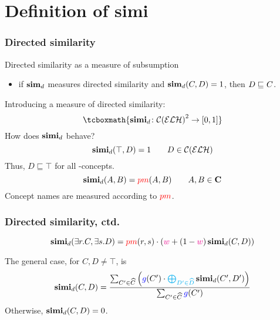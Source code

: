 \documentclass[smaller]{beamer}
\begin{document}
\section{Definition of simi}

\begin{frame}
  \frametitle{Directed similarity}
  \alert{Directed similarity} as a measure of subsumption
  \begin{itemize}
    \item if \(\operatorname{\mathbf{sim}}_d\) measures directed similarity and \(\operatorname{\mathbf{sim}}_d(C,D) = 1\), then \(D \sqsubseteq_{\mathcal{}} C\).
  \end{itemize}
  Introducing a measure of directed similarity:
  \begin{equation}
  \tcboxmath{\simi_d \colon {\mathcal{C}(\mathcal{ELH})}^2 \to [0,1]}
  \end{equation}
  How does \(\operatorname{\mathbf{simi}}_d\) behave?
  \begin{equation}
    \operatorname{\mathbf{simi}}_d(\top,D) = 1 \qquad D \in \mathcal{C}(\mathcal{ELH})
  \end{equation}
  Thus, \(D \sqsubseteq \top\) for all \elh-concepts.
  \begin{equation}
    \operatorname{\mathbf{simi}}_d(A,B) = \textcolor{red}{pm}(A,B) \qquad A,B \in \mathbf{C}
  \end{equation}
  Concept names are measured according to \(\textcolor{red}{pm}\).
\end{frame}

\begin{frame}
  \frametitle{Directed similarity, ctd.}
  \begin{equation}
    \operatorname{\mathbf{simi}}_d(\exists{}r.C,\exists{}s.D) =
    \textcolor{red}{pm}(r,s) \cdot 
    \left(\textcolor{magenta}{w} + 
    (1-\textcolor{magenta}{w})\operatorname{\mathbf{simi}}_d(C,D)\right)
  \end{equation}

  The general case, for \(C,D \ne \top\), is
  \begin{equation}
    \simi_d(C,D) =
    \frac{\sum_{C^\prime \in \widehat{C}}\left(\textcolor{blue}{g}(C^\prime) \cdot \textcolor{cyan}{\bigoplus_{D^\prime \in \widehat{D}}} \simi_d(C^\prime, D^\prime)\right)}%
    {\sum_{C^\prime \in \widehat{C}}\textcolor{blue}{g}(C^\prime)}
  \end{equation}
  Otherwise, \(\operatorname{\mathbf{simi}}_d(C,D) = 0\).
\end{frame}
\end{document}

